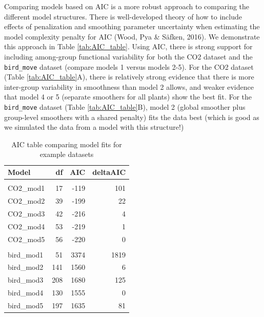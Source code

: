 \documentclass[12pt]{article}
\begin{document}
Comparing models based on AIC is a more robust approach to comparing the
different model structures. There is well-developed theory of how to
include effects of penalization and smoothing parameter uncertainty when
estimating the model complexity penalty for AIC (Wood, Pya \& Säfken,
2016). We demonstrate this approach in Table \ref{tab:AIC_table}. Using
AIC, there is strong support for including among-group functional
variability for both the CO2 dataset and the \texttt{bird\_move} dataset
(compare models 1 versus models 2-5). For the CO2 dataset (Table
\ref{tab:AIC_table}A), there is relatively strong evidence that there is
more inter-group variability in smoothness than model 2 allows, and
weaker evidence that model 4 or 5 (separate smoothers for all plants)
show the best fit. For the \texttt{bird\_move} dataset (Table
\ref{tab:AIC_table}B), model 2 (global smoother plus group-level
smoothers with a shared penalty) fits the data best (which is good as we
simulated the data from a model with this structure!)

\begin{table}

\caption{\label{tab:AIC_table_kable}AIC table comparing model fits for example datasets}
\centering
\begin{tabular}[t]{lrrr}
\toprule
Model & df & AIC & deltaAIC\\
\midrule
\addlinespace[0.3em]
\multicolumn{4}{l}{\textbf{A. CO2 models}}\\
\hspace{1em}CO2\_mod1 & 17 & -119 & 101\\
\hspace{1em}CO2\_mod2 & 39 & -199 & 22\\
\hspace{1em}CO2\_mod3 & 42 & -216 & 4\\
\hspace{1em}CO2\_mod4 & 53 & -219 & 1\\
\hspace{1em}CO2\_mod5 & 56 & -220 & 0\\
\addlinespace[0.3em]
\multicolumn{4}{l}{\textbf{B. bird\_move models}}\\
\hspace{1em}bird\_mod1 & 51 & 3374 & 1819\\
\hspace{1em}bird\_mod2 & 141 & 1560 & 6\\
\hspace{1em}bird\_mod3 & 208 & 1680 & 125\\
\hspace{1em}bird\_mod4 & 130 & 1555 & 0\\
\hspace{1em}bird\_mod5 & 197 & 1635 & 81\\
\bottomrule
\end{tabular}
\end{table}
\end{document}
